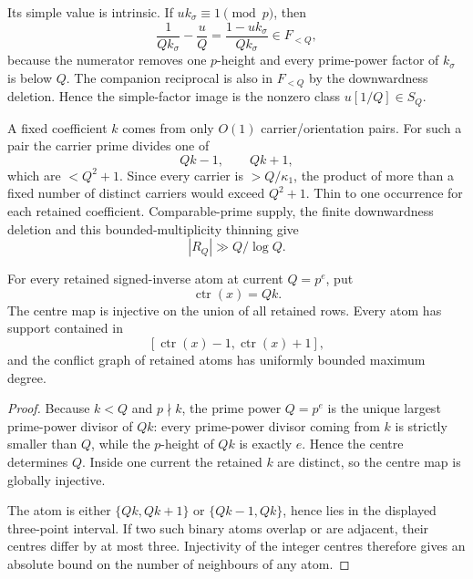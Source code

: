 Its simple value is intrinsic.  If $u k_\sigma\equiv1\pmod p$, then
\[
\frac1{Qk_\sigma}-\frac uQ
=
\frac{1-u k_\sigma}{Qk_\sigma}
\in F_{<Q},
\]
because the numerator removes one $p$-height and every prime-power factor of
$k_\sigma$ is below $Q$.  The companion reciprocal is also in $F_{<Q}$ by the
downwardness deletion.  Hence the simple-factor image is the nonzero class
$u[1/Q]\in S_Q$.

A fixed coefficient $k$ comes from only $O(1)$ carrier/orientation pairs.  For
such a pair the carrier prime divides one of
\[
Qk-1,\qquad Qk+1,
\]
which are $<Q^2+1$.  Since every carrier is $>Q/\kappa_1$, the product of more
than a fixed number of distinct carriers would exceed $Q^2+1$.  Thin to one
occurrence for each retained coefficient.  Comparable-prime supply, the
finite downwardness deletion and this bounded-multiplicity thinning give
\[
|R_Q|\gg Q/\log Q.
\tag{T2}\label{eq:raw-row-size}
\]

\begin{lemma}
\label{lem:centres-conflicts}
For every retained signed-inverse atom at current $Q=p^e$, put
\[
\operatorname{ctr}(x)=Qk.
\]
The centre map is injective on the union of all retained rows.  Every atom has
support contained in
\[
[\operatorname{ctr}(x)-1,\operatorname{ctr}(x)+1],
\]
and the conflict graph of retained atoms has uniformly bounded maximum degree.
\end{lemma}

\begin{proof}
Because $k<Q$ and $p\nmid k$, the prime power $Q=p^e$ is the unique largest
prime-power divisor of $Qk$: every prime-power divisor coming from $k$ is
strictly smaller than $Q$, while the $p$-height of $Qk$ is exactly $e$.
Hence the centre determines $Q$.  Inside one current the retained $k$ are
distinct, so the centre map is globally injective.

The atom is either $\{Qk,Qk+1\}$ or $\{Qk-1,Qk\}$, hence lies in the displayed
three-point interval.  If two such binary atoms overlap or are adjacent, their
centres differ by at most three.  Injectivity of the integer centres therefore
gives an absolute bound on the number of neighbours of any atom.
\end{proof}

